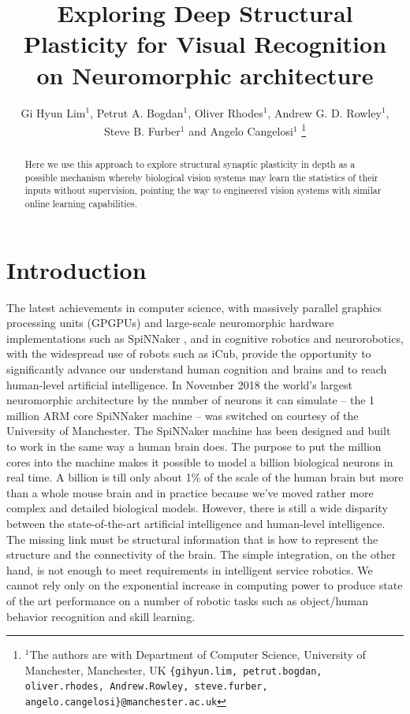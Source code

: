 \documentclass[letterpaper, 10 pt, conference]{ieeeconf}  %
\title{Exploring Deep Structural Plasticity for Visual Recognition on Neuromorphic architecture}
\author{Gi Hyun Lim$^{1}$, Petrut A. Bogdan$^{1}$, Oliver Rhodes$^{1}$, Andrew G. D. Rowley$^{1}$, \\ 
         Steve B. Furber$^{1}$ and Angelo Cangelosi$^{1}$%
\thanks{$^{1}$The authors are with Department of Computer Science, University of Manchester, Manchester, UK
{\tt\small \{gihyun.lim, petrut.bogdan, oliver.rhodes, Andrew.Rowley, steve.furber, angelo.cangelosi\}@manchester.ac.uk}}%
}
\begin{document}
\maketitle
\thispagestyle{empty}
\pagestyle{empty}


\begin{abstract}
Here we use this approach to explore structural synaptic plasticity in depth as a possible mechanism whereby biological vision systems may learn the statistics of their inputs without supervision, pointing the way to engineered vision systems with similar online learning capabilities.
\end{abstract}

\section{Introduction}

The latest achievements in computer science, with massively parallel graphics processing units (GPGPUs) and large-scale neuromorphic hardware implementations such as SpiNNaker \cite{Furber2013}, and in cognitive robotics and neurorobotics, with the widespread use of robots such as iCub, provide the opportunity to significantly advance our understand human cognition and brains and to reach human-level artificial intelligence. 
In November 2018 the world’s largest neuromorphic architecture by the number of neurons it can simulate -- the 1 million ARM core SpiNNaker machine \cite{Furber2020}-- was switched on courtesy of the University of Manchester.
The SpiNNaker machine has been designed and built to work in the same way a human brain does.
The purpose to put the million cores into the machine makes it possible to model a billion biological neurons in real time.
A billion is till only about 1\% of the scale of the human brain but more than a whole mouse brain and in practice because we’ve moved rather more complex and detailed biological models.
However, there is still a wide disparity between the state-of-the-art artificial intelligence and human-level intelligence.
The missing link must be structural information that is how to represent the structure and the connectivity of the brain.
The simple integration, on the other hand, is not enough to meet requirements in intelligent service robotics.
We cannot rely only on the exponential increase in computing power to produce state of the art performance on a number of robotic tasks such as object/human behavior recognition and skill learning.
\end{document}
